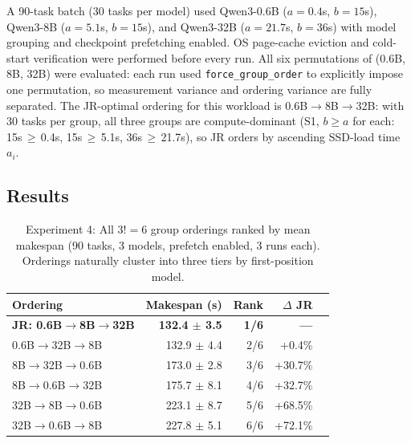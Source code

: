 \documentclass[logo,bsc,singlespacing,parskip,online]{infthesis}
\begin{document}
A 90-task batch (30 tasks per model) used Qwen3-0.6B ($a=0.4$s, $b=15$s), Qwen3-8B ($a=5.1$s, $b=15$s), and Qwen3-32B ($a=21.7$s, $b=36$s) with model grouping and checkpoint prefetching enabled. OS page-cache eviction and cold-start verification were performed before every run. All six permutations of (0.6B, 8B, 32B) were evaluated: each run used \texttt{force\_group\_order} to explicitly impose one permutation, so measurement variance and ordering variance are fully separated. The JR-optimal ordering for this workload is 0.6B$\to$8B$\to$32B: with 30 tasks per group, all three groups are compute-dominant (S1, $b\geq a$ for each: 15s\,$\geq$\,0.4s, 15s\,$\geq$\,5.1s, 36s\,$\geq$\,21.7s), so JR orders by ascending SSD-load time $a_i$.

\subsection{Results}

\begin{table}[htbp]
\centering
\caption{Experiment 4: All $3!=6$ group orderings ranked by mean makespan (90 tasks, 3 models, prefetch enabled, 3 runs each). Orderings naturally cluster into three tiers by first-position model.}
\label{tab:exp4_ordering_results}
\small
\begin{tabular}{lrrrl}
\toprule
Ordering & Makespan (s) & Rank & $\Delta$ JR \\
\midrule
\textbf{JR: 0.6B$\to$8B$\to$32B} & \textbf{132.4 $\pm$ 3.5} & \textbf{1/6} & \textbf{---} \\
0.6B$\to$32B$\to$8B           & 132.9 $\pm$ 4.4 & 2/6 & +0.4\% \\
8B$\to$32B$\to$0.6B           & 173.0 $\pm$ 2.8 & 3/6 & +30.7\%  \\
8B$\to$0.6B$\to$32B           & 175.7 $\pm$ 8.1 & 4/6 & +32.7\%  \\
32B$\to$8B$\to$0.6B           & 223.1 $\pm$ 8.7 & 5/6 & +68.5\% \\
32B$\to$0.6B$\to$8B           & 227.8 $\pm$ 5.1 & 6/6 & +72.1\% \\
\bottomrule
\end{tabular}
\normalsize
\end{table}
\end{document}

